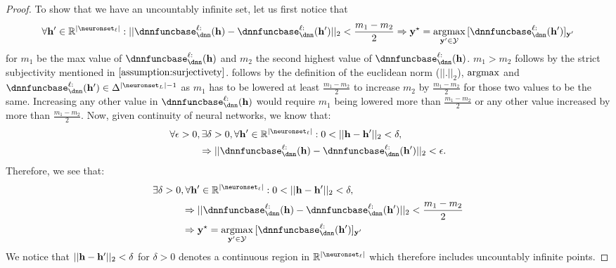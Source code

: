 \begin{proof}
     To show that we have an uncountably infinite set, let us first notice that
    \begin{align}
        \forall \hiddenstates'\in\R^{|\neuronset_\layer|}:||\dnnfunclayer{\layer:}(\hiddenstates) - \dnnfunclayer{\layer:}(\hiddenstates')||_2 < \frac{m_1-m_2}{2}\Rightarrow \class=\argmax_{\by'\in\calY}{[\dnnfunclayer{\layer:}(\hiddenstates')]_{\by'}}\label{eq:acceptable_deviation}
    \end{align}
    for $m_1$ be the max value of $\dnnfunclayer{\layer:}(\hiddenstates)$ and $m_2$ the second highest value of $\dnnfunclayer{\layer:}(\hiddenstates)$. $m_1>m_2$ follows by the strict subjectivity mentioned in $\cref{assumption:surjectivety}$.  follows by the definition of  the euclidean norm ($||.||_2$), $\operatorname*{argmax}$ and $\dnnfunclayer{\layer:}(\hiddenstates')\in\Delta^{|\neuronset_{\nlayers}|-1}$ as $m_1$ has to be lowered at least $\frac{m_1-m_2}{2}$ to increase $m_2$ by $\frac{m_1-m_2}{2}$ for those two values to be the same. Increasing any other value in $\dnnfunclayer{\layer:}(\hiddenstates)$ would require $m_1$ being lowered more than $\frac{m_1-m_2}{2}$ or any other value increased by more than $\frac{m_1-m_2}{2}$. Now, given continuity of neural networks, we know that:
    \begin{align}
        &\forall \epsilon > 0, \exists \delta > 0, \forall \hiddenstates'\in\R^{|\neuronset_\layer|} : 0 < ||\hiddenstates-\hiddenstates'||_2 < \delta, \nonumber \\
        &\qquad\quad\Rightarrow||\dnnfunclayer{\layer:}(\hiddenstates) - \dnnfunclayer{\layer:}(\hiddenstates')||_2 < \epsilon.
    \end{align}
    Therefore, we see that:
\begin{subequations}
    \begin{align}
        &\exists \delta > 0, \forall \hiddenstates'\in\R^{|\neuronset_\layer|} : 0 < ||\hiddenstates-\hiddenstates'||_2 < \delta, \nonumber \\
        &\qquad\quad\Rightarrow||\dnnfunclayer{\layer:}(\hiddenstates) - \dnnfunclayer{\layer:}(\hiddenstates')||_2 < \frac{m_1-m_2}{2}\\
        &\qquad\quad\Rightarrow \class=\argmax_{\by'\in\calY}{[\dnnfunclayer{\layer:}(\hiddenstates')]_{\by'}}
    \end{align}
\end{subequations}
    We notice that $||\mathbf{h}-\mathbf{h}'||_2 < \delta$ for $\delta>0$ denotes a continuous region in $\R^{|\neuronset_\layer|}$ which therefore includes uncountably infinite points.
\end{proof}

